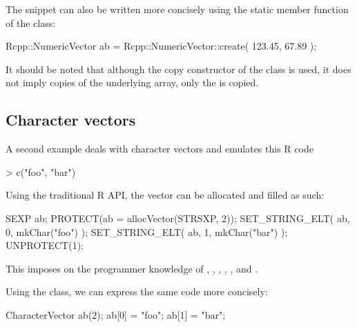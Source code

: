 % 

The snippet can also be written more concisely using the 
static member function of the  class: 

\begin{example}
Rcpp::NumericVector ab = 
    Rcpp::NumericVector::create( 123.45, 67.89 );
\end{example}

It should be noted that although the copy constructor of the 
 class is used, it does not imply copies of the 
underlying array, only the  is copied. 

\subsection{Character vectors}

A second example deals with character vectors and emulates this R code

\begin{example}
> c("foo", "bar")
\end{example}

Using the traditional R API, the vector can be allocated and filled as such:

\begin{example}
SEXP ab;
PROTECT(ab = allocVector(STRSXP, 2));
SET_STRING_ELT( ab, 0, mkChar("foo") );
SET_STRING_ELT( ab, 1, mkChar("bar") );
UNPROTECT(1);
\end{example}

This imposes on the programmer knowledge of , , 
, , , and . 

Using the  class, we can express the same
code more concisely:

\begin{example}
CharacterVector ab(2);
ab[0] = "foo";
ab[1] = "bar";
\end{example}

